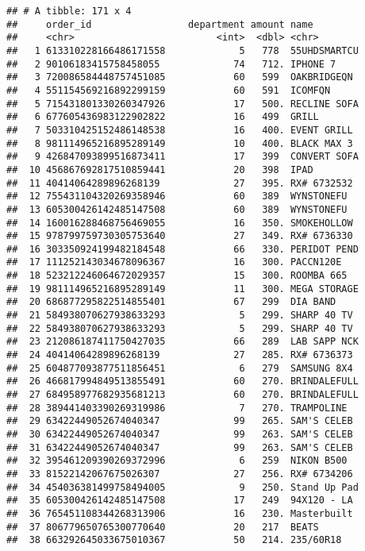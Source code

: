\documentclass[]{article}
\begin{document}
\begin{verbatim}
## # A tibble: 171 x 4
##     order_id                 department amount name        
##     <chr>                         <int>  <dbl> <chr>       
##   1 613310228166486171558             5   778  55UHDSMARTCU
##   2 90106183415758458055             74   712. IPHONE 7    
##   3 720086584448757451085            60   599  OAKBRIDGEQN 
##   4 551154569216892299159            60   591  ICOMFQN     
##   5 715431801330260347926            17   500. RECLINE SOFA
##   6 677605436983122902822            16   499  GRILL       
##   7 503310425152486148538            16   400. EVENT GRILL 
##   8 981114965216895289149            10   400. BLACK MAX 3 
##   9 426847093899516873411            17   399  CONVERT SOFA
##  10 456867692817510859441            20   398  IPAD        
##  11 40414064289896268139             27   395. RX# 6732532 
##  12 755431104320269358946            60   389  WYNSTONEFU  
##  13 605300426142485147508            60   389  WYNSTONEFU  
##  14 160016288468756469055            16   350. SMOKEHOLLOW 
##  15 978799759730305753640            27   349. RX# 6736330 
##  16 303350924199482184548            66   330. PERIDOT PEND
##  17 111252143034678096367            16   300. PACCN120E   
##  18 523212246064672029357            15   300. ROOMBA 665  
##  19 981114965216895289149            11   300. MEGA STORAGE
##  20 686877295822514855401            67   299  DIA BAND    
##  21 584938070627938633293             5   299. SHARP 40 TV 
##  22 584938070627938633293             5   299. SHARP 40 TV 
##  23 212086187411750427035            66   289  LAB SAPP NCK
##  24 40414064289896268139             27   285. RX# 6736373 
##  25 604877093877511856451             6   279  SAMSUNG 8X4 
##  26 466817994849513855491            60   270. BRINDALEFULL
##  27 684958977682935681213            60   270. BRINDALEFULL
##  28 389441403390269319986             7   270. TRAMPOLINE  
##  29 63422449052674040347             99   265. SAM'S CELEB 
##  30 63422449052674040347             99   263. SAM'S CELEB 
##  31 63422449052674040347             99   263. SAM'S CELEB 
##  32 395461209390269372996             6   259  NIKON B500  
##  33 81522142067675026307             27   256. RX# 6734206 
##  34 454036381499758494005             9   250. Stand Up Pad
##  35 605300426142485147508            17   249  94X120 - LA 
##  36 765451108344268313906            16   230. Masterbuilt 
##  37 806779650765300770640            20   217  BEATS       
##  38 663292645033675010367            50   214. 235/60R18   

\end{verbatim}
\end{document}
